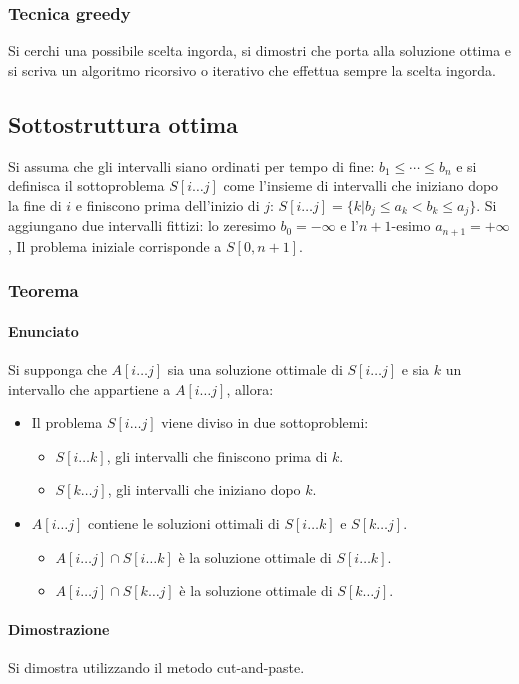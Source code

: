 \subsubsection{Tecnica greedy}
Si cerchi una possibile scelta ingorda, si dimostri che porta alla soluzione ottima e si scriva un algoritmo ricorsivo o iterativo che effettua sempre la scelta ingorda.
\subsection{Sottostruttura ottima}
Si assuma che gli intervalli siano ordinati per tempo di fine: $b_1\le \cdots\le b_n$ e si definisca il sottoproblema $S[i\dots j]$ come l'insieme di intervalli che iniziano dopo la fine
di $i$ e finiscono prima dell'inizio di $j$: $S[i\dots j] = \{k|b_j\le a_k < b_k\le a_j\}$. Si aggiungano due intervalli fittizi: lo zeresimo $b_0=-\infty$ e l'$n+1$-esimo 
$a_{n+1} = +\infty$, Il problema iniziale corrisponde a $S[0, n+1]$. 
\subsubsection{Teorema}
\paragraph{Enunciato}
Si supponga che $A[i\dots j]$ sia una soluzione ottimale di $S[i\dots j]$ e sia $k$ un intervallo che appartiene a $A[i\dots j]$, allora:
\begin{itemize}
	\item Il problema $S[i\dots j]$ viene diviso in due sottoproblemi:
		\begin{itemize}
			\item $S[i\dots k]$, gli intervalli che finiscono prima di $k$.
			\item $S[k\dots j]$, gli intervalli che iniziano dopo $k$.
		\end{itemize}
	\item $A[i\dots j]$ contiene le soluzioni ottimali di $S[i\dots k]$ e $S[k\dots j]$.
		\begin{itemize}
			\item $A[i\dots j]\cap S[i\dots k]$ \`e la soluzione ottimale di $S[i\dots k]$.
			\item $A[i\dots j]\cap S[k\dots j]$ \`e la soluzione ottimale di $S[k\dots j]$.
		\end{itemize}
\end{itemize}
\paragraph{Dimostrazione}
Si dimostra utilizzando il metodo cut-and-paste.
